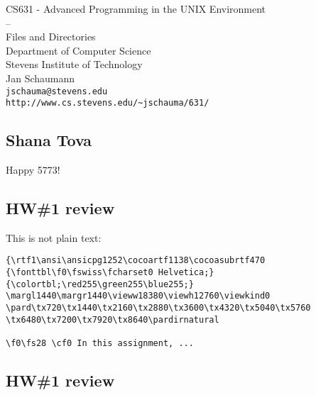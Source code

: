 \documentclass[xga]{xdvislides}
\begin{document}
\setfontphv

\lhead{\slidetitle}
\cfoot{\relax}
\rfoot{\Gray{\today}}

\vspace*{\fill}
\begin{center}
	\Hugesize
		CS631 - Advanced Programming in the UNIX Environment\\
		-- \\
		Files and Directories
	\hspace*{5mm}\blueline\\ [1em]
	\Normalsize
		Department of Computer Science\\
		Stevens Institute of Technology\\
		Jan Schaumann\\
		\verb+jschauma@stevens.edu+\\
		\verb+http://www.cs.stevens.edu/~jschauma/631/+
\end{center}
\vspace*{\fill}

\subsection{Shana Tova}
\vspace*{\fill}
\begin{center}
\Huge
Happy 5773!
\Normalsize
\end{center}
\vspace*{\fill}

\subsection{HW\#1 review}
This is not plain text:

\begin{verbatim}
{\rtf1\ansi\ansicpg1252\cocoartf1138\cocoasubrtf470
{\fonttbl\f0\fswiss\fcharset0 Helvetica;}
{\colortbl;\red255\green255\blue255;}
\margl1440\margr1440\vieww18380\viewh12760\viewkind0
\pard\tx720\tx1440\tx2160\tx2880\tx3600\tx4320\tx5040\tx5760
\tx6480\tx7200\tx7920\tx8640\pardirnatural

\f0\fs28 \cf0 In this assignment, ...
\end{verbatim}

\subsection{HW\#1 review}
\end{document}
